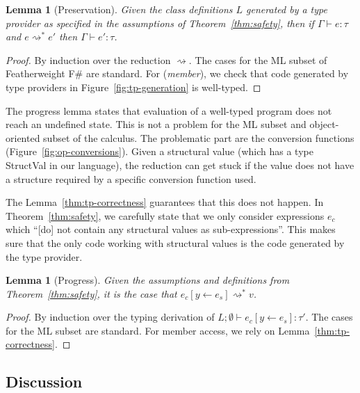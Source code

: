 \documentclass[10pt,preprint,clearpagebib]{sigplanconf}
\newcommand{\ident}[1]{\textnormal{\sffamily #1}}
\newcommand{\reduce}{\rightsquigarrow}
\newtheorem{lemma}[theorem]{Lemma}
\begin{document}
\begin{lemma}[Preservation]
\label{thm:rs-preservation}
Given the class definitions $L$ generated by a type provider as specified in
the assumptions of Theorem~\ref{thm:safety}, then if $\Gamma \vdash e : \tau$ and 
$e \reduce^{*} e'$ then $\Gamma \vdash e' : \tau$.
\end{lemma}
\begin{proof}
By induction over the reduction $\reduce$. The cases for the ML subset of Featherweight F\# 
are standard. For (\emph{member}), we check that code generated by type providers
in Figure~\ref{fig:tp-generation} is well-typed.
\end{proof}

\noindent
The progress lemma states that evaluation of a well-typed program does not reach an undefined state. 
This is not a problem for the ML subset and object-oriented subset of the calculus. The problematic
part are the conversion functions (Figure~\ref{fig:op-conversions}). Given a structural value 
(which has a type \ident{StructVal} in our language), the reduction can get stuck if the value does
not have a structure required by a specific conversion function used.

The Lemma~\ref{thm:tp-correctness} guarantees that this does not happen. In Theorem~\ref{thm:safety},
we carefully state that we only consider expressions $e_c$ which ``[do] not contain any structural 
values as sub-expressions''. This makes sure that the only code working with structural values is the
code generated by the type provider.

\begin{lemma}[Progress]
\label{thm:rs-progress}
Given the assumptions and definitions from Theorem~\ref{thm:safety}, it is the case that
$e_c[y\leftarrow e_s] \reduce^{*} v$.
\end{lemma}
\begin{proof}
By induction over the typing derivation of $L; \emptyset \vdash e_c[y\leftarrow e_s] : \tau'$. 
The cases for the ML subset are standard. For member access, we rely on Lemma~\ref{thm:tp-correctness}.
\end{proof}


\subsection{Discussion}
\label{sec:safety-discuss}
\end{document}
